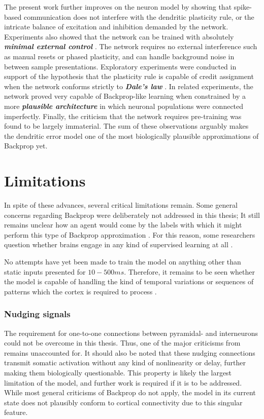 The present work further improves on the neuron model by showing that spike-based communication does not interfere with
the dendritic plasticity rule, or the intricate balance of excitation and inhibition demanded by the network.
Experiments also showed that the network can be trained with absolutely \textit{\textbf{minimal external control}}
\citep{Whittington2017}. The network requires no external interference such as manual resets or phased plasticity, and
can handle background noise in between sample presentations. Exploratory experiments were conducted in support of the
hypothesis that the plasticity rule is capable of credit assignment when the network conforms strictly to
\textit{\textbf{Dale's law}} \citep{Bartunov2018}. In related experiments, the network proved very capable of
Backprop-like learning when constrained by a more \textit{\textbf{plausible architecture}} \citep{Whittington2017} in
which neuronal populations were connected imperfectly. Finally, the criticism that the network requires pre-training
\citep{whittington2019theories} was found to be largely immaterial. The sum of these observations arguably makes the
dendritic error model one of the most biologically plausible approximations of Backprop yet. 


\section{Limitations}

In spite of these advances, several critical limitations remain. Some general concerns regarding Backprop were
deliberately not addressed in this thesis; It still remains unclear how an agent would come by the labels with which it
might perform this type of Backprop approximation \citep{Bengio2015}. For this reason, some researchers question whether
brains engage in any kind of supervised learning at all \citep{magee2020synaptic}. 


No attempts have yet been made to train the model on anything other than static inputs presented for $10-500ms$.
Therefore, it remains to be seen whether the model is capable of handling the kind of temporal variations or sequences
of patterns which the cortex is required to process \citep{Yamins2016}.

\subsubsection*{Nudging signals}

The requirement for one-to-one connections between pyramidal- and interneurons could not be overcome in this thesis.
Thus, one of the major criticisms from \citep{whittington2019theories} remains unaccounted for. It should also be noted
that these nudging connections transmit somatic activation without any kind of nonlinearity or delay, further making
them biologically questionable. This property is likely the largest limitation of the model, and further work is
required if it is to be addressed. While most general criticisms of Backprop do not apply, the model in its current
state does not plausibly conform to cortical connectivity due to this singular feature.

